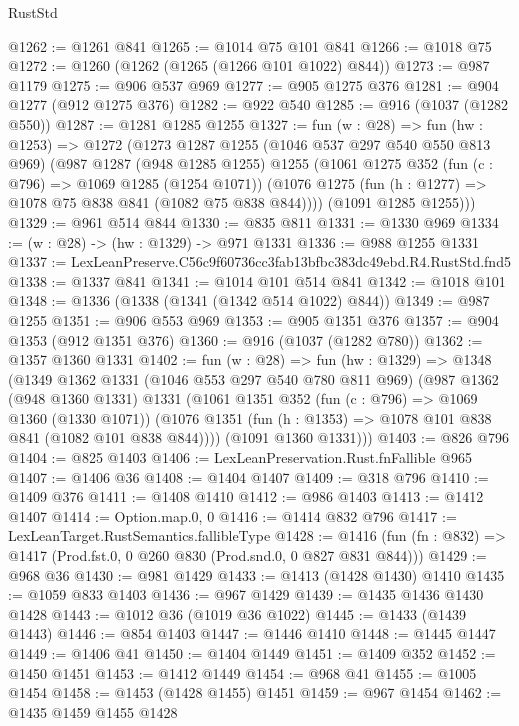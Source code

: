 \begin{lexlean}{RustStd}
\begin{coremodule}
@1262 := @1261 @841
@1265 := @1014 @75 @101 @841
@1266 := @1018 @75
@1272 := @1260 (@1262 (@1265 (@1266 @101 @1022) @844))
@1273 := @987 @1179
@1275 := @906 @537 @969
@1277 := @905 @1275 @376
@1281 := @904 @1277 (@912 @1275 @376)
@1282 := @922 @540
@1285 := @916 (@1037 (@1282 @550))
@1287 := @1281 @1285 @1255
@1327 := fun (w : @28) =>
  fun (hw : @1253) =>
  @1272
    (@1273
      @1287
      @1255
      (@1046 @537 @297 @540 @550 @813 @969)
      (@987
        @1287
        (@948 @1285 @1255)
        @1255
        (@1061
          @1275
          @352
          (fun (c : @796) => @1069 @1285 (@1254 @1071))
          (@1076 @1275 (fun (h : @1277) => @1078 @75 @838 @841 (@1082 @75 @838 @844))))
        (@1091 @1285 @1255)))
@1329 := @961 @514 @844
@1330 := @835 @811
@1331 := @1330 @969
@1334 := (w : @28) -> (hw : @1329) -> @971 @1331
@1336 := @988 @1255 @1331
@1337 := LexLeanPreserve.C56c9f60736cc3fab13bfbc383dc49ebd.R4.RustStd.fnd5
@1338 := @1337 @841
@1341 := @1014 @101 @514 @841
@1342 := @1018 @101
@1348 := @1336 (@1338 (@1341 (@1342 @514 @1022) @844))
@1349 := @987 @1255
@1351 := @906 @553 @969
@1353 := @905 @1351 @376
@1357 := @904 @1353 (@912 @1351 @376)
@1360 := @916 (@1037 (@1282 @780))
@1362 := @1357 @1360 @1331
@1402 := fun (w : @28) =>
  fun (hw : @1329) =>
  @1348
    (@1349
      @1362
      @1331
      (@1046 @553 @297 @540 @780 @811 @969)
      (@987
        @1362
        (@948 @1360 @1331)
        @1331
        (@1061
          @1351
          @352
          (fun (c : @796) => @1069 @1360 (@1330 @1071))
          (@1076 @1351 (fun (h : @1353) => @1078 @101 @838 @841 (@1082 @101 @838 @844))))
        (@1091 @1360 @1331)))
@1403 := @826 @796
@1404 := @825 @1403
@1406 := LexLeanPreservation.Rust.fnFallible @965
@1407 := @1406 @36
@1408 := @1404 @1407
@1409 := @318 @796
@1410 := @1409 @376
@1411 := @1408 @1410
@1412 := @986 @1403
@1413 := @1412 @1407
@1414 := Option.map.{0, 0}
@1416 := @1414 @832 @796
@1417 := LexLeanTarget.RustSemantics.fallibleType
@1428 := @1416
    (fun (fn : @832) => @1417 (Prod.fst.{0, 0} @260 @830 (Prod.snd.{0, 0} @827 @831 @844)))
@1429 := @968 @36
@1430 := @981 @1429
@1433 := @1413 (@1428 @1430) @1410
@1435 := @1059 @833 @1403
@1436 := @967 @1429
@1439 := @1435 @1436 @1430 @1428
@1443 := @1012 @36 (@1019 @36 @1022)
@1445 := @1433 (@1439 @1443)
@1446 := @854 @1403
@1447 := @1446 @1410
@1448 := @1445 @1447
@1449 := @1406 @41
@1450 := @1404 @1449
@1451 := @1409 @352
@1452 := @1450 @1451
@1453 := @1412 @1449
@1454 := @968 @41
@1455 := @1005 @1454
@1458 := @1453 (@1428 @1455) @1451
@1459 := @967 @1454
@1462 := @1435 @1459 @1455 @1428

\end{coremodule}
\end{lexlean}
